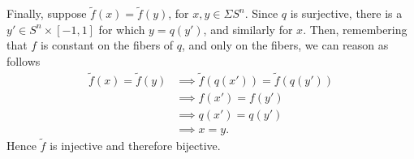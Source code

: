 \documentclass{homework651}
\begin{document}
\begin{aproblems}
Finally, suppose $\tilde f(x)=\tilde f(y)$, for $x,y\in \Sigma S^n$.
Since $q$ is surjective, there is a $y'\in S^n\times[-1,1]$ for which
$y=q(y')$, and similarly for $x$.  Then, remembering that $f$ is constant
on the fibers of $q$, and only on the fibers, we can reason as follows
\begin{align*}
\tilde f(x)=\tilde f(y) &\implies \tilde f(q(x'))=\tilde f(q(y')) \\
 &\implies f(x')=f(y') \\
 &\implies q(x')=q(y') \\
 &\implies x=y.
\end{align*}
Hence $\tilde f$ is injective and therefore bijective.

\end{aproblems}
\end{document}

